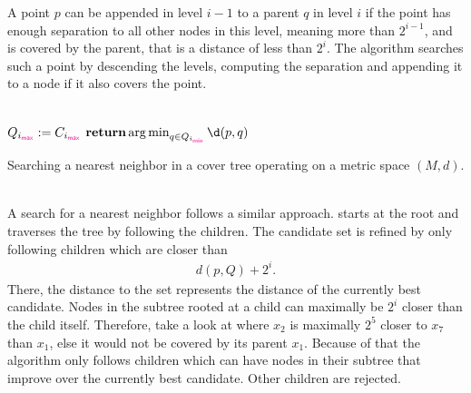 	A point $p$ can be appended in level $i - 1$ to a parent $q$ in level $i$ if the point has enough separation to all other
	nodes in this level, meaning more than $2^{i - 1}$, and is covered by the parent, that is a distance of less than $2^i$.
	The algorithm searches such a point by descending the levels, computing the separation and appending it to a
	node if it also covers the point.\\\\
	\IncMargin{1em}
	\begin{algorithm}
		\BlankLine
		\BlankLine
		$Q_{i_{\textcolor{magenta}{\textsf{max}}}} := C_{i_{\textcolor{magenta}{\textsf{max}}}}$\;
		$\Return \argmin_{q \in Q_{i_{\vmin}}} \d(p, q)$\;
		\BlankLine
		\caption{Searching a nearest neighbor in a cover tree operating on a metric space $(M, d)$.}\label{coverTreeSearch}
	\end{algorithm}\DecMargin{1em}\quad\\
	A search for a nearest neighbor follows a similar approach.  starts at the root and traverses
	the tree by following the children. The candidate set is refined by only following children which are closer than
	\begin{align*}
		d(p, Q) + 2^i.
	\end{align*}
	There, the distance to the set represents the distance of the currently best candidate. Nodes in the subtree
	rooted at a child can maximally be $2^i$ closer than the child itself. Therefore, take a look
	at  where $x_2$ is maximally $2^5$ closer to $x_7$ than $x_1$, else it would not
	be covered by its parent $x_1$.
	Because of that the algorithm only follows children which can have nodes in their subtree
	that improve over the currently best candidate. Other children are rejected.
	
